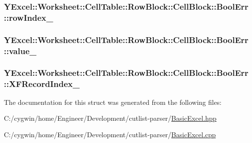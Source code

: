 \subsubsection[{row\+Index\+\_\+}]{ Y\+Excel\+::\+Worksheet\+::\+Cell\+Table\+::\+Row\+Block\+::\+Cell\+Block\+::\+Bool\+Err\+::row\+Index\+\_\+}\label{struct_y_excel_1_1_worksheet_1_1_cell_table_1_1_row_block_1_1_cell_block_1_1_bool_err_a5ae3ae54c1d015a79e237cb13285d0af}
\hypertarget{struct_y_excel_1_1_worksheet_1_1_cell_table_1_1_row_block_1_1_cell_block_1_1_bool_err_a04a0eaeb16a7e193ce0d02de24659b11}{}
\subsubsection[{value\+\_\+}]{ Y\+Excel\+::\+Worksheet\+::\+Cell\+Table\+::\+Row\+Block\+::\+Cell\+Block\+::\+Bool\+Err\+::value\+\_\+}\label{struct_y_excel_1_1_worksheet_1_1_cell_table_1_1_row_block_1_1_cell_block_1_1_bool_err_a04a0eaeb16a7e193ce0d02de24659b11}
\hypertarget{struct_y_excel_1_1_worksheet_1_1_cell_table_1_1_row_block_1_1_cell_block_1_1_bool_err_adf216fa699c3f9d3416416f879209d52}{}
\subsubsection[{X\+F\+Record\+Index\+\_\+}]{ Y\+Excel\+::\+Worksheet\+::\+Cell\+Table\+::\+Row\+Block\+::\+Cell\+Block\+::\+Bool\+Err\+::\+X\+F\+Record\+Index\+\_\+}\label{struct_y_excel_1_1_worksheet_1_1_cell_table_1_1_row_block_1_1_cell_block_1_1_bool_err_adf216fa699c3f9d3416416f879209d52}


The documentation for this struct was generated from the following files\+:\begin{DoxyCompactItemize}
\item 
C\+:/cygwin/home/\+Engineer/\+Development/cutlist-\/parser/\hyperlink{_basic_excel_8hpp}{Basic\+Excel.\+hpp}\item 
C\+:/cygwin/home/\+Engineer/\+Development/cutlist-\/parser/\hyperlink{_basic_excel_8cpp}{Basic\+Excel.\+cpp}\end{DoxyCompactItemize}
